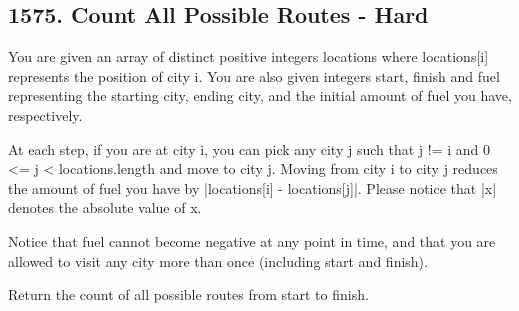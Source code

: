 \documentclass[9pt, b5paaper]{book}
\begin{document}
\subsection{1575. Count All Possible Routes - Hard}
\label{sec-1-4-13}
You are given an array of distinct positive integers locations where locations[i] represents the position of city i. You are also given integers start, finish and fuel representing the starting city, ending city, and the initial amount of fuel you have, respectively.

At each step, if you are at city i, you can pick any city j such that j != i and 0 <= j < locations.length and move to city j. Moving from city i to city j reduces the amount of fuel you have by |locations[i] - locations[j]|. Please notice that |x| denotes the absolute value of x.

Notice that fuel cannot become negative at any point in time, and that you are allowed to visit any city more than once (including start and finish).

Return the count of all possible routes from start to finish.
\end{document}
